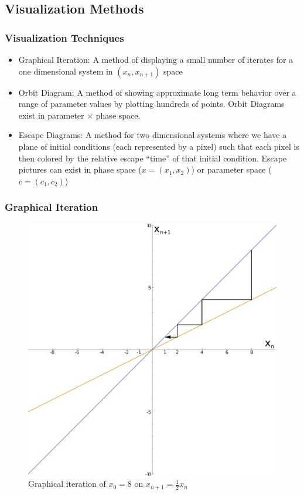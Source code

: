 \documentclass{beamer}
\newcommand{\<}{\left\langle}
\renewcommand{\>}{\right\rangle} %
\renewcommand{\*}{\cdot} %
\begin{document}
\subsection{Visualization Methods}
\begin{frame}
	\frametitle{Visualization Techniques}
	\begin{itemize}
		\item Graphical Iteration: A method of displaying a small number of iterates for a one dimensional system in $ (x_n, x_{n+1})$ space
		\item Orbit Diagram: A method of showing approximate long term behavior over a range of parameter values by plotting hundreds of points. Orbit Diagrams exist in parameter $\times$ phase space.
		\item Escape Diagrams: A method for two dimensional systems where we have a plane of initial conditions (each represented by a pixel) such that each pixel is then colored by the relative escape ``time'' of that initial condition. Escape pictures can exist in phase space ($x = (x_1, x_2)$) or parameter space ($c = (c_1, c_2)$)
	\end{itemize}
\end{frame}

\begin{frame}
	\frametitle{Graphical Iteration}
	\begin{figure}
		\includegraphics[height=.85\textheight]{./img/simplegraphit}
		\caption{Graphical iteration of $x_0 = 8$ on $x_{n+1} = \frac{1}{2}x_n$}
	\end{figure}
\end{frame}
\end{document}
